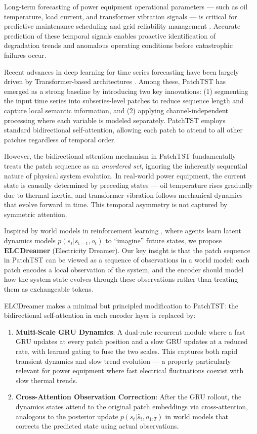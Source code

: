 \documentclass[conference]{IEEEtran}
\begin{document}
Long-term forecasting of power equipment operational parameters --- such as oil temperature, load current, and transformer vibration signals --- is critical for predictive maintenance scheduling and grid reliability management \cite{b_grid1}. Accurate prediction of these temporal signals enables proactive identification of degradation trends and anomalous operating conditions before catastrophic failures occur.

Recent advances in deep learning for time series forecasting have been largely driven by Transformer-based architectures \cite{b_transformer}. Among these, PatchTST \cite{b_patchtst} has emerged as a strong baseline by introducing two key innovations: (1) segmenting the input time series into subseries-level patches to reduce sequence length and capture local semantic information, and (2) applying channel-independent processing where each variable is modeled separately. PatchTST employs standard bidirectional self-attention, allowing each patch to attend to all other patches regardless of temporal order.

However, the bidirectional attention mechanism in PatchTST fundamentally treats the patch sequence as an \emph{unordered set}, ignoring the inherently sequential nature of physical system evolution. In real-world power equipment, the current state is causally determined by preceding states --- oil temperature rises gradually due to thermal inertia, and transformer vibration follows mechanical dynamics that evolve forward in time. This temporal asymmetry is not captured by symmetric attention.

Inspired by world models in reinforcement learning \cite{b_dreamer, b_worldmodel}, where agents learn latent dynamics models $p(s_t | s_{t-1}, o_t)$ to ``imagine'' future states, we propose \textbf{ELCDreamer} (Electricity Dreamer). Our key insight is that the patch sequence in PatchTST can be viewed as a sequence of observations in a world model: each patch encodes a local observation of the system, and the encoder should model how the system state evolves through these observations rather than treating them as exchangeable tokens.

ELCDreamer makes a minimal but principled modification to PatchTST: the bidirectional self-attention in each encoder layer is replaced by:
\begin{enumerate}
    \item \textbf{Multi-Scale GRU Dynamics}: A dual-rate recurrent module where a fast GRU updates at every patch position and a slow GRU updates at a reduced rate, with learned gating to fuse the two scales. This captures both rapid transient dynamics and slow trend evolution --- a property particularly relevant for power equipment where fast electrical fluctuations coexist with slow thermal trends.
    \item \textbf{Cross-Attention Observation Correction}: After the GRU rollout, the dynamics states attend to the original patch embeddings via cross-attention, analogous to the posterior update $p(s_t | \hat{s}_t, o_{1:T})$ in world models that corrects the predicted state using actual observations.
\end{enumerate}
\end{document}
